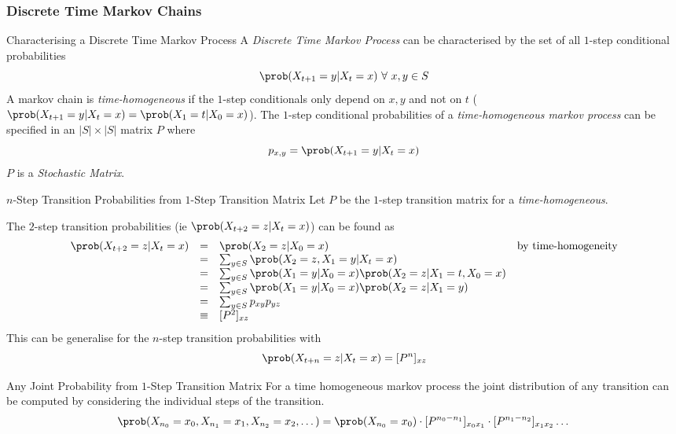 \documentclass[11pt,a4paper]{article}
\begin{document}
\subsubsection{Discrete Time Markov Chains}

\begin{proposition}{Characterising a Discrete Time Markov Process}
  A \textit{Discrete Time Markov Process} can be characterised by the set of all $1$-step conditional probabilities
  \[ \prob(X_{t+1}=y|X_t=x)\ \forall\ x,y\in S \]
  A markov chain is \textit{time-homogeneous} if the $1$-step conditionals only depend on $x,y$ and not on $t$ ($\prob(X_{t+1}=y|X_t=x)=\prob(X_1=t|X_0=x)$). The $1$-step conditional probabilities of a \textit{time-homogeneous markov process} can be specified in an $|S|\times |S|$ matrix $P$ where
  \[ p_{x,y}=\prob(X_{t+1}=y|X_t=x) \]
  $P$ is a \textit{Stochastic Matrix}.
\end{proposition}

\begin{proposition}{$n$-Step Transition Probabilities from $1$-Step Transition Matrix}
  Let $P$ be the $1$-step transition matrix for a \textit{time-homogeneous}.

  \par The $2$-step transition probabilities (ie $\prob(X_{t+2}=z|X_t=x)$) can be found as
  \[\begin{array}{rcll}
    \prob(X_{t+2}=z|X_t=x)&=&\prob(X_2=z|X_0=x)&\text{by time-homogeneity}\\
    &=&\sum_{y\in S}\prob(X_2=z,X_1=y|X_t=x)\\
    &=&\sum_{y\in S}\prob(X_1=y|X_0=x)\prob(X_2=z|X_1=t,X_0=x)\\
    &=&\sum_{y\in S}\prob(X_1=y|X_0=x)\prob(X_2=z|X_1=y)\\
    &=&\sum_{y\in S}p_{xy}p_{yz}\\
    &\equiv&[P^2]_{xz}
  \end{array}\]
  This can be generalise for the $n$-step transition probabilities with
  \[ \prob(X_{t+n}=z|X_t=x)=[P^n]_{xz} \]
\end{proposition}

\begin{proposition}{Any Joint Probability from $1$-Step Transition Matrix}
  For a time homogeneous markov process the joint distribution of any transition can be computed by considering the individual steps of the transition.
  \[ \prob(X_{n_0}=x_0,X_{n_1}=x_1,X_{n_2}=x_2,\dots)=\prob(X_{n_0}=x_0)\cdot[P^{n_0-n_1}]_{x_0x_1}\cdot[P^{n_1-n_2}]_{x_1x_2}\dots \]
\end{proposition}
\end{document}
